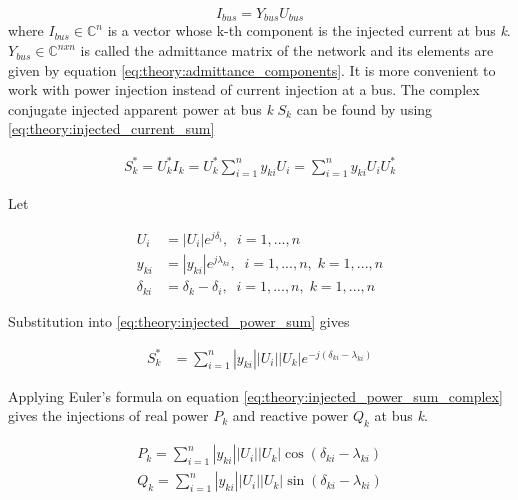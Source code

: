 \documentclass[class=book, crop=false]{standalone}
\begin{document}
\begin{equation}\label{eq:theory:powerflow_busmatrix}
I_{bus} = Y_{bus}U_{bus}
\end{equation}
where $I_{bus} \in{\boldsymbol{\mathbb{C}}^{n}}$ is a vector whose k-th component is the injected current at bus \textit{k}. $Y_{bus}\in{\boldsymbol{\mathbb{C}}^{nxn}}$ is called the admittance matrix of the network and its elements are given by equation \eqref{eq:theory:admittance_components}. It is more convenient to work with power injection instead of current injection at a bus. The complex conjugate injected apparent power at bus \textit{k} $S_{k}$ can be found by using \eqref{eq:theory:injected_current_sum}

\begin{equation}
    \begin{aligned}\label{eq:theory:injected_power_sum}
    S^{*}_{k} = U^{*}_{k}I_{k} = U^{*}_{k}\sum_{i=1}^{n} y_{ki}U_{i}
    = \sum_{i=1}^{n} y_{ki}U_{i}U^{*}_{k}
    \end{aligned} 
\end{equation}


Let

\begin{equation}
    \begin{aligned}\label{eq:theory:injected_power_sum_varialbes}
    U_{i} &= |U_{i}|e^{j\delta_{i}}, \;\; i = 1,...,n \\
    y_{ki} &= |y_{ki}|e^{j\lambda_{ki}}, \;\; i = 1,...,n, \; k = 1,...,n \\
    \delta_{ki} &= \delta_{k} - \delta_{i}, \;\; i = 1,...,n, \; k = 1,...,n 
    \end{aligned} 
\end{equation}


Substitution into \eqref{eq:theory:injected_power_sum} gives 

\begin{equation}
    \begin{aligned}\label{eq:theory:injected_power_sum_complex}
    S^{*}_{k} &= \sum_{i=1}^{n}|y_{ki}||U_{i}||U_{k}|e^{-j(\delta_{ki}-\lambda_{ki})}
    \end{aligned} 
\end{equation}



Applying Euler's formula on equation \eqref{eq:theory:injected_power_sum_complex} gives the injections of real power $P_{k}$ and reactive power $Q_{k}$ at bus \textit{k}.

\begin{equation}
    \begin{aligned}\label{eq:theory:power_flow_equation}
    P_{k} =  \sum_{i=1}^{n}|y_{ki}||U_{i}||U_{k}|\cos{(\delta_{ki}-\lambda_{ki})}
    \\
    Q_{k} =  \sum_{i=1}^{n}|y_{ki}||U_{i}||U_{k}|\sin{(\delta_{ki}-\lambda_{ki})}
    \end{aligned} 
\end{equation}
\end{document}
